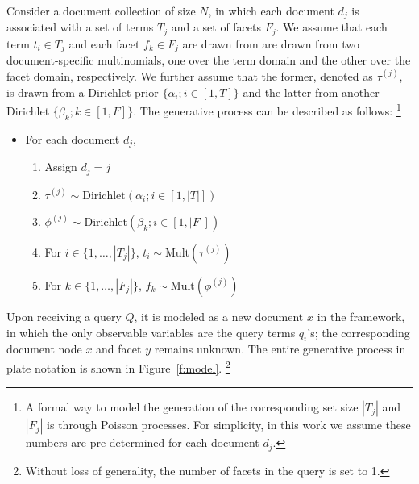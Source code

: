 Consider a document collection of size $N$, in which each document $d_j$ is
associated with a set of terms $T_j$ and a set of facets $F_j$.  We assume that
each term $t_i \in T_j$ and each facet $f_k \in F_j$ are drawn from are drawn
from two document-specific multinomials, one over the term domain and the other
over the facet domain, respectively.  We further assume that the former,
denoted as $\tau^{(j)}$, is drawn from a Dirichlet prior $\{ \alpha_i; i \in
[1, T] \}$ and the latter from another Dirichlet $\{ \beta_k; k \in [1, F] \}$.
The generative process can be described as follows: \footnote{A formal way to
model the generation of the corresponding set size $|T_j|$ and $|F_j|$ is
through Poisson processes.  For simplicity, in this work we assume these
numbers are pre-determined for each document $d_j$.} 

\begin{itemize} 
  \item For each document $d_j$, \begin{enumerate}
    \item Assign $d_j = j$
    \item $\tau^{(j)} \sim \textrm{Dirichlet}(\alpha_i; i \in [1, |T|])$
    \item $\phi^{(j)} \sim \textrm{Dirichlet}(\beta_k; i \in [1, |F|])$
    \item For $i \in \{ 1, \ldots, |T_j| \}$, $t_i \sim \textrm{Mult}(\tau^{(j)})$ 
    \item For $k \in \{ 1, \ldots, |F_j| \}$, $f_k \sim \textrm{Mult}(\phi^{(j)})$ 
  \end{enumerate}
\end{itemize}

Upon receiving a query $Q$, it is modeled as a new document $x$ in the
framework, in which the only observable variables are the query terms $q_i$'s;
the corresponding document node $x$ and facet $y$ remains unknown.  The entire
generative process in plate notation is shown in Figure~\ref{f:model}.
\footnote{Without loss of generality, the number of facets in the query is set
to 1. }  

